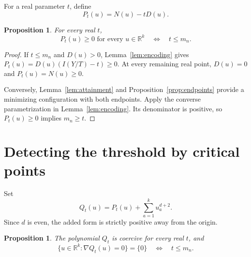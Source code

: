 \documentclass[11pt,leqno]{amsart}
\newtheorem{proposition}[theorem]{Proposition}
\theoremstyle{definition}
\theoremstyle{remark}
\numberwithin{equation}{section}
\newcommand{\R}{\mathbb R}
\begin{document}
For a real parameter $t$, define
\begin{equation}\label{eq:P}
 P_t(u)=N(u)-tD(u).
\end{equation}

\begin{proposition}\label{prop:threshold}
For every real $t$,
\begin{equation}\label{eq:nonnegative-threshold}
 P_t(u)\geq0\text{ for every }u\in\R^k
 \quad\Longleftrightarrow\quad t\leq m_n.
\end{equation}
\end{proposition}

\begin{proof}
If $t\leq m_n$ and $D(u)>0$, Lemma~\ref{lem:encoding} gives
$P_t(u)=D(u)(I(Y/T)-t)\geq0$. At every remaining real point,
$D(u)=0$ and $P_t(u)=N(u)\geq0$.

Conversely, Lemma~\ref{lem:attainment} and
Proposition~\ref{prop:endpoints} provide a minimizing configuration
with both endpoints. Apply the converse parametrization in
Lemma~\ref{lem:encoding}. Its denominator is positive, so
$P_t(u)\geq0$ implies $m_n\geq t$.
\end{proof}

\section{Detecting the threshold by critical points}\label{sec:critical}

Set
\begin{equation}\label{eq:Q}
 Q_t(u)=P_t(u)+\sum_{a=1}^k u_a^{d+2}.
\end{equation}
Since $d$ is even, the added form is strictly positive away from the origin.

\begin{proposition}\label{prop:critical}
The polynomial $Q_t$ is coercive for every real $t$, and
\begin{equation}\label{eq:critical-threshold}
 \{u\in\R^k:\nabla Q_t(u)=0\}=\{0\}
 \quad\Longleftrightarrow\quad t\leq m_n.
\end{equation}
\end{proposition}
\end{document}
